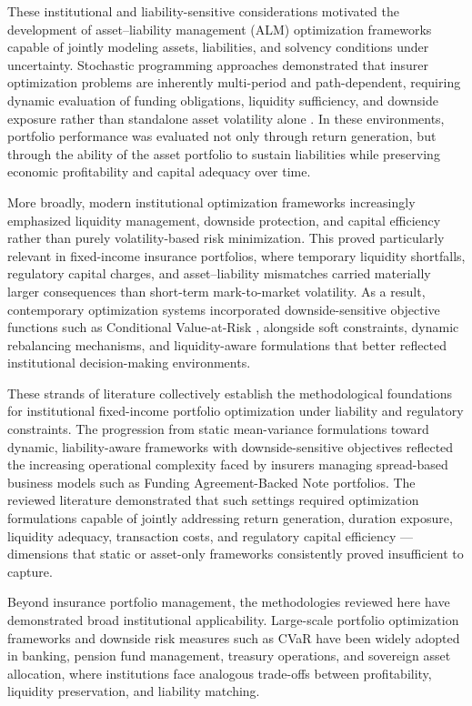 \documentclass[12pt]{article}
\begin{document}
These institutional and liability-sensitive considerations motivated the development of asset--liability management (ALM) optimization frameworks capable of jointly modeling assets, liabilities, and solvency conditions under uncertainty. Stochastic programming approaches demonstrated that insurer optimization problems are inherently multi-period and path-dependent, requiring dynamic evaluation of funding obligations, liquidity sufficiency, and downside exposure rather than standalone asset volatility alone \parencite{Carino1994TheProgramming, Consigli1998DynamicManagement}. In these environments, portfolio performance was evaluated not only through return generation, but through the ability of the asset portfolio to sustain liabilities while preserving economic profitability and capital adequacy over time.

More broadly, modern institutional optimization frameworks increasingly emphasized liquidity management, downside protection, and capital efficiency rather than purely volatility-based risk minimization. This proved particularly relevant in fixed-income insurance portfolios, where temporary liquidity shortfalls, regulatory capital charges, and asset--liability mismatches carried materially larger consequences than short-term mark-to-market volatility. As a result, contemporary optimization systems incorporated downside-sensitive objective functions such as Conditional Value-at-Risk \parencite{Rockafellar2000OptimizationValue-at-Risk}, alongside soft constraints, dynamic rebalancing mechanisms, and liquidity-aware formulations that better reflected institutional decision-making environments.

These strands of literature collectively establish the methodological foundations for institutional fixed-income portfolio optimization under liability and regulatory constraints. The progression from static mean-variance formulations toward dynamic, liability-aware frameworks with downside-sensitive objectives reflected the increasing operational complexity faced by insurers managing spread-based business models such as Funding Agreement-Backed Note portfolios. The reviewed literature demonstrated that such settings required optimization formulations capable of jointly addressing return generation, duration exposure, liquidity adequacy, transaction costs, and regulatory capital efficiency --- dimensions that static or asset-only frameworks consistently proved insufficient to capture.

Beyond insurance portfolio management, the methodologies reviewed here have demonstrated broad institutional applicability. Large-scale portfolio optimization frameworks \parencite{Perold1984Large-ScaleOptimization} and downside risk measures such as CVaR \parencite{Rockafellar2000OptimizationValue-at-Risk} have been widely adopted in banking, pension fund management, treasury operations, and sovereign asset allocation, where institutions face analogous trade-offs between profitability, liquidity preservation, and liability matching.
\end{document}
